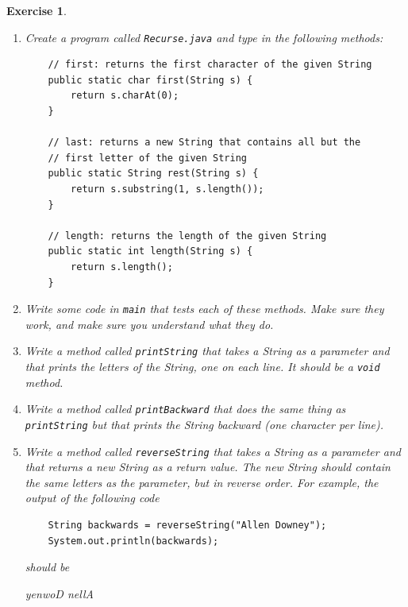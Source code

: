 \documentclass[12pt]{book}
\theoremstyle{exercise}
\newtheorem{exercise}{Exercise}[chapter]
\begin{document}
\begin{exercise}
\begin{enumerate}

\item Create a program called {\tt Recurse.java} and
type in the following methods:

\begin{lstlisting}
    // first: returns the first character of the given String
    public static char first(String s) {
        return s.charAt(0);
    }

    // last: returns a new String that contains all but the
    // first letter of the given String
    public static String rest(String s) {
        return s.substring(1, s.length());
    }

    // length: returns the length of the given String
    public static int length(String s) {
        return s.length();
    }
\end{lstlisting}

\item Write some code in {\tt main} that tests each of these
methods.  Make sure they work, and make sure you understand
what they do.

\item Write a method called {\tt printString} that takes a
String as a parameter and that prints the letters of the
String, one on each line.  It should be a {\tt void} method.

\item Write a method called {\tt printBackward} that does
the same thing as {\tt printString} but that prints the String
backward (one character per line).

\item Write a method called {\tt reverseString} that takes
a String as a parameter and that returns a new String as a
return value.  The new String should contain the same letters
as the parameter, but in reverse order.  For example, the
output of the following code

\begin{lstlisting}
    String backwards = reverseString("Allen Downey");
    System.out.println(backwards);
\end{lstlisting}
%
should be

\begin{verbatimtab}
yenwoD nellA
\end{verbatimtab}

\end{enumerate}
\end{exercise}
\end{document}
